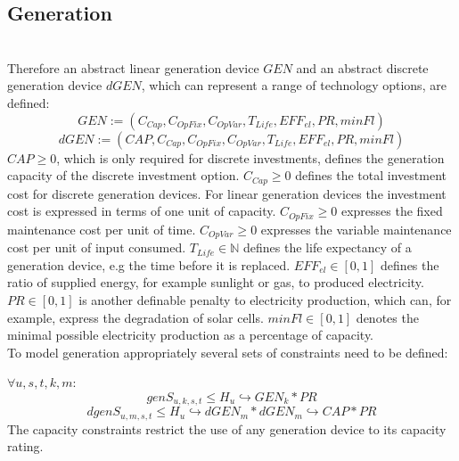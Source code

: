 \documentclass[
	11pt,								%
	DIV10,								%
	a4paper,         					%
	oneside,							%
	headheight=20pt,					%
	footheight=20pt,					%
    parskip=full,						%
    listof=totoc,						%
	bibliography=totoc,					%
	index=totoc,						%
]{scrartcl}
\begin{document}
\subsection{Generation}
\\
Therefore an abstract linear generation device $GEN$ and an abstract discrete generation device $dGEN$, which can represent a range of technology options, are defined:\\
	\begin{equation}
		GEN := (C_{Cap}, C_{OpFix}, C_{OpVar}, T_{Life}, EFF_{el}, PR, minFl)
	\end{equation}
	\begin{equation}
		dGEN := (CAP, C_{Cap}, C_{OpFix}, C_{OpVar}, T_{Life}, EFF_{el}, PR, minFl)
	\end{equation}
	$CAP \geq 0$, which is only required for discrete investments, defines the generation capacity of the discrete investment option.
	$C_{Cap} \geq 0$ defines the total investment cost for discrete generation devices. For linear generation devices the investment cost is expressed in terms of one unit of capacity.
	$C_{OpFix} \geq 0$ expresses the fixed maintenance cost per unit of time.
	$C_{OpVar} \geq 0$ expresses the variable maintenance cost per unit of input consumed.
	$T_{Life} \in \mathbb{N}$ defines the life expectancy of a generation device, e.g the time before it is replaced. 
	$EFF_{el} \in [0,1]$ defines the ratio of supplied energy, for example sunlight or gas, to produced electricity.
	$PR \in [0,1]$ is another definable penalty to electricity production, which can, for example, express the degradation of solar cells. 	
	$minFl \in [0,1]$ denotes the minimal possible electricity production as a percentage of capacity.
	\\
	To model generation appropriately several sets of constraints need to be defined:
	
	$\forall u,s,t,k,m$:
	\begin{equation}
		genS_{u,k,s,t} \leq H_u\hookrightarrow  GEN_k * PR
	\end{equation}
	\begin{equation}
		dgenS_{u,m,s,t} \leq H_u\hookrightarrow  dGEN_m * dGEN_m\hookrightarrow  CAP * PR
	\end{equation}
	The capacity constraints restrict the use of any generation device to its capacity rating.
\end{document}
